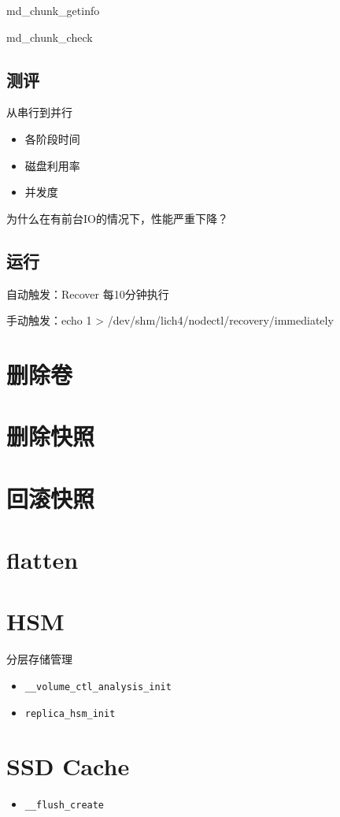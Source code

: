 md\_chunk\_getinfo

md\_chunk\_check

\subsection{测评}

从串行到并行

\begin{itemize}
    \item 各阶段时间
    \item 磁盘利用率
    \item 并发度
\end{itemize}

为什么在有前台IO的情况下，性能严重下降？

\subsection{运行}

\begin{tcolorbox}
    自动触发：Recover 每10分钟执行

    手动触发：echo 1 > /dev/shm/lich4/nodectl/recovery/immediately
\end{tcolorbox}

\section{删除卷}

\section{删除快照}

\section{回滚快照}

\section{flatten}

\section{HSM}

分层存储管理
\begin{itemize}
\item \verb|__volume_ctl_analysis_init|
\item \verb|replica_hsm_init|
\end{itemize}

\section{SSD Cache}

\begin{itemize}
\item \verb|__flush_create|
\end{itemize}
